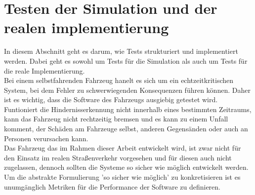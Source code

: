\section{Testen der Simulation und der realen implementierung}
In diesem Abschnitt geht es darum, wie Tests strukturiert und implementiert werden. Dabei geht es sowohl um Tests für die Simulation als auch um Tests für die reale Implementierung. \\
Bei einem selbstfahrenden Fahrzeug hanelt es sich um ein echtzeitkritischen System, bei dem Fehler zu schwerwiegenden Konsequenzen führen können. Daher ist es wichtig, dass die Software des Fahrzeugs ausgiebig getestet wird. \\
Funtioniert die Hindernisserkennung nicht innerhalb eines bestimmten Zeitraums, kann das Fahrzeug nicht rechtzeitig bremsen und es kann zu einem Unfall komment, 
der Schäden am Fahrzeuge selbst, anderen Gegensänden oder auch an Personen verursachen kann. \\
Das Fahrzeug das im Rahmen dieser Arbeit entwickelt wird, ist zwar nicht für den Einsatz im realen Straßenverkehr vorgesehen und für diesen auch nicht zugelassen,
dennoch sollten die Systeme so sicher wie möglich entwickelt werden. \\
Um die abstrakte Formulierung 'so sicher wie möglich' zu konkretisieren ist es unumgänglich Metriken für die Performance der Software zu definieren.
